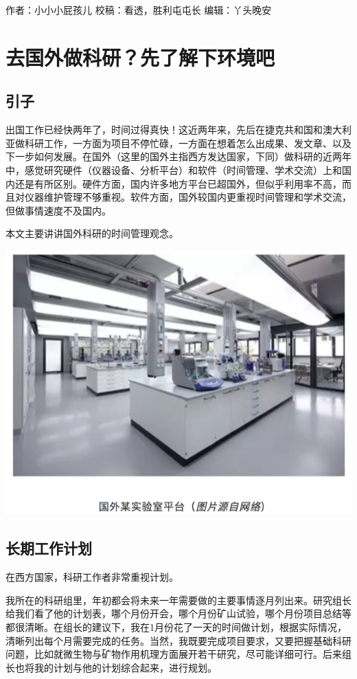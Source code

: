 \documentclass[]{book}
\begin{document}
作者：小小小屁孩儿 校稿：看透，胜利屯屯长 编辑：丫头晚安

\section{去国外做科研？先了解下环境吧}

\subsection{引子}

出国工作已经快两年了，时间过得真快！这近两年来，先后在捷克共和国和澳大利亚做科研工作，一方面为项目不停忙碌，一方面在想着怎么出成果、发文章、以及下一步如何发展。在国外（这里的国外主指西方发达国家，下同）做科研的近两年中，感觉研究硬件（仪器设备、分析平台）和软件（时间管理、学术交流）上和国内还是有所区别。硬件方面，国内许多地方平台已超国外，但似乎利用率不高，而且对仪器维护管理不够重视。软件方面，国外较国内更重视时间管理和学术交流，但做事情速度不及国内。

本文主要讲讲国外科研的时间管理观念。

\includegraphics[width=8.33in]{images/osre1}

\subsection{长期工作计划}

在西方国家，科研工作者非常重视计划。

我所在的科研组里，年初都会将未来一年需要做的主要事情逐月列出来。研究组长给我们看了他的计划表，哪个月份开会，哪个月份矿山试验，哪个月份项目总结等都很清晰。在组长的建议下，我在1月份花了一天的时间做计划，根据实际情况，清晰列出每个月需要完成的任务。当然，我既要完成项目要求，又要把握基础科研问题，比如就微生物与矿物作用机理方面展开若干研究，尽可能详细可行。后来组长也将我的计划与他的计划综合起来，进行规划。
\end{document}

